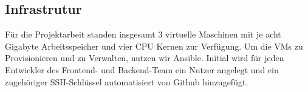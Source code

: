 \subsection{Infrastrutur}
Für die Projektarbeit standen insgesamt 3 virtuelle Maschinen mit je acht Gigabyte Arbeitsspeicher und vier CPU Kernen zur Verfügung.
Um die VMs zu Provisionieren und zu Verwalten, nutzen wir Ansible.
Initial wird für jeden Entwickler des Frontend- und Backend-Team ein Nutzer angelegt und ein zugehöriger SSH-Schlüssel automatisiert von Github hinzugefügt.
